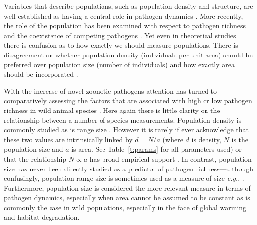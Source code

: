 
Variables that describe populations, such as population density and structure, are well established as having a central role in pathogen dynamics \cite{colizza2007invasion, barthelemy2010fluctuation, colizza2007invasion,  wu2013threshold, may1979population, anderson1979population}.
More recently, the role of the population has been examined with respect to pathogen richness and the coexistence of competing pathogens \cite{qiu2013vector, allen2004sis, nunes2006localized}.
Yet even in theoretical studies there is confusion as to how exactly we should measure populations.
There is disagreement on whether population density (individuals per unit area) should be preferred over population size (number of individuals) and how exactly area should be incorporated \cite{begon2002clarification}. 


With the increase of novel zoonotic pathogens \cite{jones2008global} attention has turned to comparatively assessing the factors that are associated with high or low pathogen richness in wild animal species \cite{poulin2000diversity}.
Here again there is little clarity on the relationship between a number of species measurements.
Population density is commonly studied \cite{morand1998density, kamiya2014determines, lindenfors2007parasite, nunn2003comparative, arneberg2002host} as is range size \cite{lindenfors2007parasite, nunn2003comparative, turmelle2009correlates, huang2015parasite, kamiya2014determines}.
However it is rarely if ever acknowledge that these two values are intrinsically linked by $d = N/a$ (where $d$ is density, $N$ is the population size and $a$ is area. See Table~\ref{t:params} for all parameters used) or that the relationship $N \propto a$ has broad empirical support \cite{blackburn2006variations, borregaard2010causality}.
In contrast, population size has never been directly studied as a predictor of pathogen richness---although confusingly, population range size is sometimes used as a measure of size \emph{e.g.}, \cite{vogeli2011island}.
Furthermore, population size is considered the more relevant measure in terms of pathogen dynamics, especially when area cannot be assumed to be constant \cite{begon2002clarification} as is commonly the case in wild populations, especially in the face of global warming and habitat degradation.

